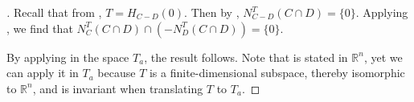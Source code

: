 \documentclass{article}
\theoremstyle{plain}
\theoremstyle{definition}
\theoremstyle{remark}
\begin{document}
\begin{proof}[\hypertarget{loc:qualification_conditions_always_hold_in_the_joint_supporting_subspace.proof}Proof of \Cref{loc:qualification_conditions_always_hold_in_the_joint_supporting_subspace.statement}]

Recall that from , $T = H_{C-D}(0)$.
Then by
,
$N_{C-D}^T(C \cap D) = \{0\}$. Applying
, we find that
$N^T_C(C \cap D) \cap (-N^T_D(C \cap D)) = \{0\}$.

By applying 
in the space $T_a$, the result follows. Note that  is stated in $\mathbb{R}^n$, yet we can apply it
in $T_a$ because $T$ is a finite-dimensional subspace, thereby isomorphic to $\mathbb{R}^n$, and
is invariant when translating $T$ to $T_a$. 
\end{proof}
\end{document}
